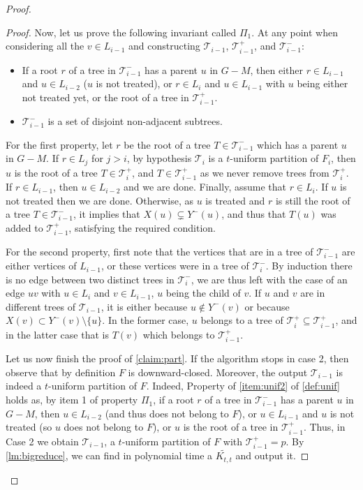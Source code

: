 \documentclass{amsart}
\newcommand{\mT}{\mathcal{T}}
\newcommand{\KttTilde}{\widetilde{K_{t,t}}}
\begin{document}
\begin{proof}
\begin{proof}
Now, let us prove the following invariant called $\Pi_1$. At any point when considering all the $v \in L_{i-1}$ and constructing $\mT_{i-1}$, $\mT_{i-1}^+$, and $\mT_{i-1}^-$:
\begin{itemize}
    \item If a root $r$ of a tree in $\mT_{i-1}^-$ has a parent $u$ in $G-M$, then either $r\in L_{i-1}$ and $u  \in L_{i-2}$ ($u$ is not treated), or $r\in L_{i}$ and $u \in L_{i-1}$ with $u$ being either not treated yet, or the root of a tree in  $\mT_{i-1}^+$.
    \item $\mT_{i-1}^-$ is a set of disjoint non-adjacent subtrees.
\end{itemize}  
For the first property,
let $r$ be the root of a tree $T \in \mT_{i-1}^-$ which has a parent $u$ in $G-M$. If $r \in L_{j}$ for $j >i$, by hypothesis $\mT_i$ is a $t$-uniform partition of $F_i$, then $u$ is the root of a tree $T \in \mT_i^+$, and $T \in \mT_{i-1}^+$ as we never remove trees from $\mT_i^+$.
If $r \in L_{i-1}$, then $u \in L_{i-2}$ and we are done.
Finally, assume that $r \in L_{i}$. If $u$ is not treated then we are done. Otherwise, as $u$ is treated and $r$ is still the root of a tree $T \in \mT_{i-1}^-$, it implies that $X(u)\subsetneq Y^-(u)$, and thus that $T(u)$ was added to $\mT_{i-1}^+$, satisfying the required condition.


For the second property, first note that the vertices that are in a tree of $\mT_{i-1}^-$ are either vertices of $L_{i-1}$, or these vertices were in a tree of $\mT_{i}^-$.
By induction there is no edge between two distinct trees in $\mT_{i}^-$, we are thus left with the case of an edge $uv$ with $u\in L_i$ and $v\in L_{i-1}$, $u$ being the child of $v$.
If $u$ and $v$ are in different trees of $\mT_{i-1}$, it is either because $u\notin Y^-(v)$ or because $X(v) \subset Y^-(v) \setminus \{u\}$.
In the former case, $u$ belongs to a tree of $\mT^+_{i} \subseteq \mT^+_{i-1}$, and in the latter case that is $T(v)$ which belongs to $\mT^+_{i-1}$.


Let us now finish the proof of \autoref{claim:part}.
If the algorithm stops in case 2, then observe that by definition $F$ is downward-closed.
Moreover, the output $\mT_{i-1}$ is indeed a $t$-uniform partition of $F$. 
Indeed, Property of \autoref{item:unif2}  of \autoref{def:unif} holds as, by item 1 of property $\Pi_1$, if a root $r$ of a tree in $\mT_{i-1}^-$ has a parent $u$ in $G-M$, then $u  \in L_{i-2}$ (and thus does not belong to $F$), or $u \in L_{i-1}$ and $u$ is not treated (so $u$ does not belong to $F$), or $u$ is the root of a tree in  $\mT_{i-1}^+$.
Thus, in Case 2 we obtain $\mT_{i-1}$, a $t$-uniform partition of $F$ with $\mT_{i-1}^+=p$. By \autoref{lm:bigreduce}, we can find in polynomial time a $\KttTilde$ and output it.


\end{proof}
\end{proof}
\end{document}

